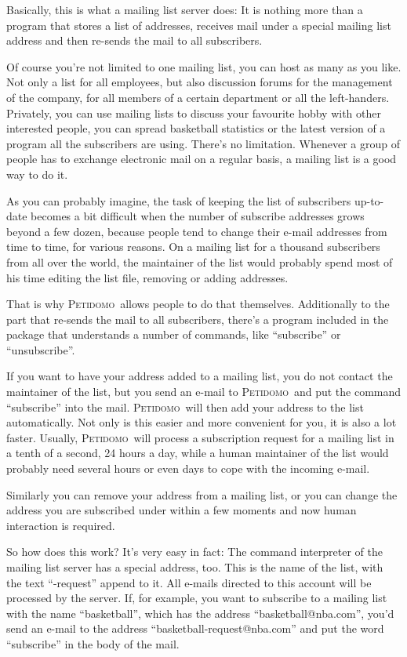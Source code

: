 \documentclass[a4paper,10pt]{scrreprt}
\newcommand{\Petidomo}{{\scshape Peti\-domo}}
\begin{document}
Basically, this is what a mailing list server does: It is nothing more
than a program that stores a list of addresses, receives mail under a
special mailing list address and then re-sends the mail to all
subscribers.

Of course you're not limited to one mailing list, you can host as many
as you like. Not only a list for all employees, but also discussion
forums for the management of the company, for all members of a certain
department or all the left-handers. Privately, you can use mailing
lists to discuss your favourite hobby with other interested people,
you can spread basketball statistics or the latest version of a
program all the subscribers are using. There's no limitation. Whenever
a group of people has to exchange electronic mail on a regular basis,
a mailing list is a good way to do it.

\bigskip

As you can probably imagine, the task of keeping the list of
subscribers up-to-date becomes a bit difficult when the number of
subscribe addresses grows beyond a few dozen, because people tend to
change their e-mail addresses from time to time, for various reasons.
On a mailing list for a thousand subscribers from all over the world,
the maintainer of the list would probably spend most of his time
editing the list file, removing or adding addresses.

That is why \Petidomo\ allows people to do that themselves.
Additionally to the part that re-sends the mail to all subscribers,
there's a program included in the package that understands a number of
commands, like ``subscribe'' or ``unsubscribe''.

If you want to have your address added to a mailing list, you do not
contact the maintainer of the list, but you send an e-mail to
\Petidomo\ and put the command ``subscribe'' into the mail. \Petidomo\
will then add your address to the list automatically. Not only is this
easier and more convenient for you, it is also a lot faster. Usually,
\Petidomo\ will process a subscription request for a mailing list in a
tenth of a second, 24 hours a day, while a human maintainer of the
list would probably need several hours or even days to cope with the
incoming e-mail.

Similarly you can remove your address from a mailing list, or you can
change the address you are subscribed under within a few moments and
now human interaction is required.

So how does this work? It's very easy in fact: The command interpreter
of the mailing list server has a special address, too. This is the
name of the list, with the text ``-request'' append to it. All e-mails
directed to this account will be processed by the server. If, for
example, you want to subscribe to a mailing list with the name
``basketball'', which has the address ``basketball@nba.com'', you'd
send an e-mail to the address ``basketball-request@nba.com'' and put
the word ``subscribe'' in the body of the mail.
\end{document}
